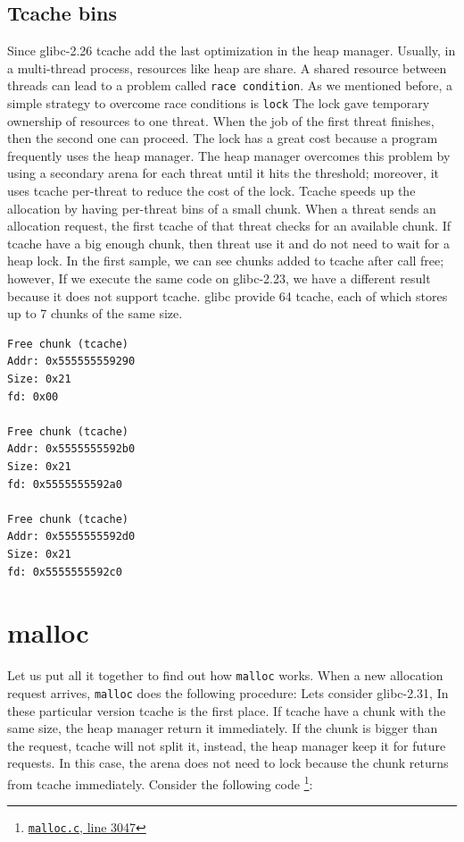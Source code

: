 \documentclass{masterthesis}
\newcommand*\libc{glibc}
\newcommand*\tch{tcache}
\newcommand*\Tch{Tcache\xspace}
\newcommand*\mallocc{\lstinline{malloc}\xspace}
\begin{document}
\subsection{\Tch bins}
Since \libc{-2.26} \tch{} add the last optimization in the heap manager. Usually, in a multi-thread process, resources like heap are share. A shared resource between threads can lead to a problem called \lstinline{race condition}. As we mentioned before, a simple strategy to overcome race conditions is \lstinline{lock} The lock gave temporary ownership of resources to one threat. When the job of the first threat finishes, then the second one can proceed. The lock has a great cost because a program frequently uses the heap manager. The heap manager overcomes this problem by using a secondary arena for each threat until it hits the threshold; moreover, it uses \tch{} per-threat to reduce the cost of the lock. \Tch{} speeds up the allocation by having per-threat bins of a small chunk. When a threat sends an allocation request, the first \tch{} of that threat checks for an available chunk. If \tch{} have a big enough chunk, then threat use it and do not need to wait for a heap lock. In the first sample, we can see chunks added to \tch{} after call free; however, If we execute the same code on \libc{-2.23}, we have a different result because it does not support \tch{}. \libc{} provide 64 \tch{}, each of which stores up to 7 chunks of the same size. 

\begin{lstlisting}[frame=tlrb]
Free chunk (tcache)
Addr: 0x555555559290
Size: 0x21
fd: 0x00

Free chunk (tcache)
Addr: 0x5555555592b0
Size: 0x21
fd: 0x5555555592a0

Free chunk (tcache)
Addr: 0x5555555592d0
Size: 0x21
fd: 0x5555555592c0
\end{lstlisting}

\section{malloc}
Let us put all it together to find out how \mallocc{} works. When a new allocation request arrives, \mallocc{} does the following procedure:
Lets consider \libc{-2.31}, In these particular version \tch{} is the first place. If \tch{} have a chunk with the same size, the heap manager return it immediately. If the chunk is bigger than the request, \tch{} will not split it, instead, the heap manager keep it for future requests. In this case, the arena does not need to lock because the chunk returns from \tch{} immediately. Consider the following code \footnote{\href{https://sourceware.org/git/?p=glibc.git;a=blob;f=malloc/malloc.c;h=f7cd29bc2f93e1082ee77800bd64a4b2a2897055;hb=9ea3686266dca3f004ba874745a4087a89682617\#l3047}{\texttt{malloc.c}, line 3047}}:
\end{document}
